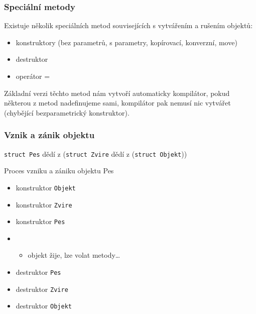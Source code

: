 
\begin{frame}
\frametitle{Speciální metody}
\begin{block}{}
Existuje několik speciálních metod souvisejících s vytvářením a rušením objektů:
\begin{itemize}
\item konstruktory (bez parametrů, s parametry, kopírovací, konverzní, move)
\item destruktor
\item operátor =
\end{itemize}
Základní verzi těchto metod nám vytvoří automaticky kompilátor, pokud některou z metod nadefinujeme sami, kompilátor pak nemusí nic vytvářet (chybějící bezparametrický konstruktor).
\end{block}
\end{frame}


\begin{frame}[fragile]
\frametitle{Vznik a zánik objektu}
\begin{block}{}
\lstinline|struct Pes| dědí z (\lstinline|struct Zvire| dědí z (\lstinline|struct Objekt|))
\end{block}

\begin{block}{Proces vzniku a zániku objektu Pes}
\begin{itemize}
\item konstruktor \lstinline|Objekt|
\item konstruktor \lstinline|Zvire|
\item konstruktor \lstinline|Pes|
\item[]
\begin{itemize}
\item objekt žije, lze volat metody\ldots
\end{itemize}

\item destruktor \lstinline|Pes|
\item destruktor \lstinline|Zvire|
\item destruktor \lstinline|Objekt|
\end{itemize}
\end{block}
\end{frame}








